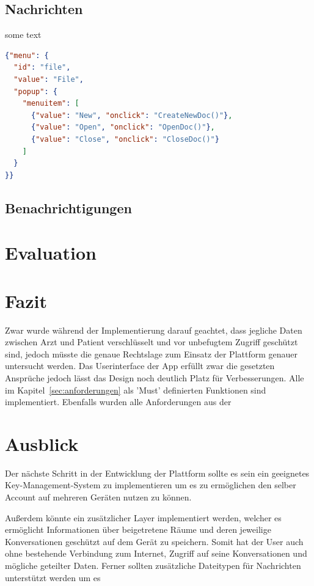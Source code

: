     \section{Nachrichten}\label{sec:nachrichten}
    some text

    \begin{lstlisting}[language=json,firstnumber=1]
{"menu": {
  "id": "file",
  "value": "File",
  "popup": {
    "menuitem": [
      {"value": "New", "onclick": "CreateNewDoc()"},
      {"value": "Open", "onclick": "OpenDoc()"},
      {"value": "Close", "onclick": "CloseDoc()"}
    ]
  }
}}
    \end{lstlisting}

    \newpage
    \section{Benachrichtigungen}\label{sec:benachrichtigungen}

    \newpage
    \chapter{Evaluation}
    \chapter{Fazit}\label{ch:fazit}
    Zwar wurde während der Implementierung darauf geachtet, dass jegliche Daten zwischen Arzt und Patient verschlüsselt und vor unbefugtem Zugriff geschützt sind, jedoch müsste die genaue Rechtslage zum Einsatz der Plattform genauer untersucht werden.
    Das Userinterface der App erfüllt zwar die gesetzten Ansprüche jedoch lässt das Design noch deutlich Platz für Verbesserungen.
    Alle im Kapitel~\ref{sec:anforderungen} als 'Must' definierten Funktionen sind implementiert.
    Ebenfalls wurden alle Anforderungen aus der

    \chapter{Ausblick}\label{ch:ausblick}
    Der nächste Schritt in der Entwicklung der Plattform sollte es sein ein geeignetes Key-Management-System zu implementieren um es zu ermöglichen den selber Account auf mehreren Geräten nutzen zu können.

    Außerdem könnte ein zusätzlicher Layer implementiert werden, welcher es ermöglicht Informationen über beigetretene Räume und deren jeweilige Konversationen geschützt auf dem Gerät zu speichern.
    Somit hat der User auch ohne bestehende Verbindung zum Internet, Zugriff auf seine Konversationen und mögliche geteilter Daten.
    Ferner sollten zusätzliche Dateitypen für Nachrichten unterstützt werden um es

